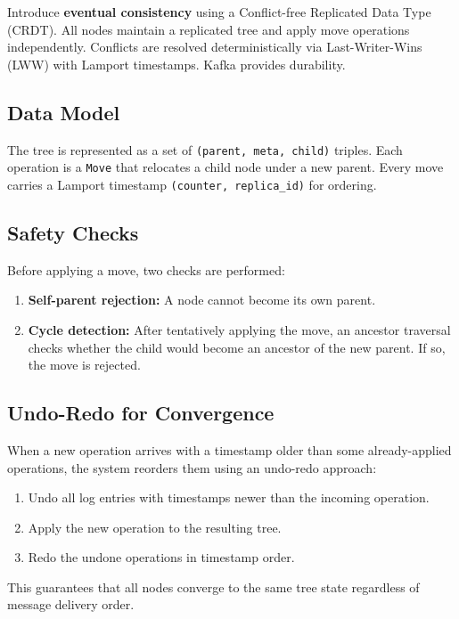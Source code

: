 \documentclass[12pt, a4paper]{article}
\begin{document}
Introduce \textbf{eventual consistency} using a Conflict-free Replicated Data Type (CRDT). All nodes maintain a replicated tree and apply move operations independently. Conflicts are resolved deterministically via Last-Writer-Wins (LWW) with Lamport timestamps. Kafka provides durability.

\subsection{Data Model}

The tree is represented as a set of \texttt{(parent, meta, child)} triples. Each operation is a \texttt{Move} that relocates a child node under a new parent. Every move carries a Lamport timestamp \texttt{(counter, replica\_id)} for ordering.

\subsection{Safety Checks}

Before applying a move, two checks are performed:

\begin{enumerate}
    \item \textbf{Self-parent rejection:} A node cannot become its own parent.
    \item \textbf{Cycle detection:} After tentatively applying the move, an ancestor traversal checks whether the child would become an ancestor of the new parent. If so, the move is rejected.
\end{enumerate}

\subsection{Undo-Redo for Convergence}

When a new operation arrives with a timestamp older than some already-applied operations, the system reorders them using an undo-redo approach:

\begin{enumerate}
    \item Undo all log entries with timestamps newer than the incoming operation.
    \item Apply the new operation to the resulting tree.
    \item Redo the undone operations in timestamp order.
\end{enumerate}

This guarantees that all nodes converge to the same tree state regardless of message delivery order.
\end{document}
